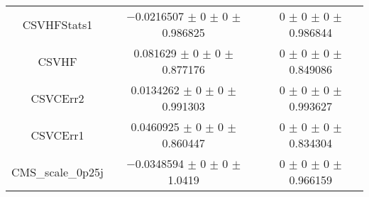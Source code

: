 \begin{table}
\begin{tabular}{ccc}
CSVHFStats1 & \num{-0.0216507} $\pm$ \num{0} $\pm$ \num{0} $\pm$ \num{0.986825} & \num{0} $\pm$ \num{0} $\pm$ \num{0} $\pm$ \num{0.986844}\\
CSVHF & \num{0.081629} $\pm$ \num{0} $\pm$ \num{0} $\pm$ \num{0.877176} & \num{0} $\pm$ \num{0} $\pm$ \num{0} $\pm$ \num{0.849086}\\
CSVCErr2 & \num{0.0134262} $\pm$ \num{0} $\pm$ \num{0} $\pm$ \num{0.991303} & \num{0} $\pm$ \num{0} $\pm$ \num{0} $\pm$ \num{0.993627}\\
CSVCErr1 & \num{0.0460925} $\pm$ \num{0} $\pm$ \num{0} $\pm$ \num{0.860447} & \num{0} $\pm$ \num{0} $\pm$ \num{0} $\pm$ \num{0.834304}\\
CMS\_scale\_0p25j & \num{-0.0348594} $\pm$ \num{0} $\pm$ \num{0} $\pm$ \num{1.0419} & \num{0} $\pm$ \num{0} $\pm$ \num{0} $\pm$ \num{0.966159}\\
\bottomrule
\end{tabular}
\end{table}